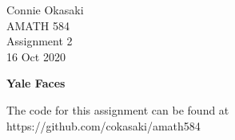 \documentclass[letter, 12pt]{article}
\begin{document}
\parindent=0in
\newenvironment{problem}[1][]
   {\begin{framed} \textbf{Problem \theprobnum: #1}}
   {\end{framed}\stepcounter{probnum}}
\newenvironment{bookproblem}[1]
   {\begin{framed} \textbf{Problem #1:}}
   {\end{framed}\stepcounter{probnum}}

\begin{flushright}
Connie Okasaki \\
AMATH 584\\
Assignment 2\\
16 Oct 2020
\end{flushright}

\textbf{Yale Faces}

The code for this assignment can be found at https://github.com/cokasaki/amath584 ~\\
\end{document}
